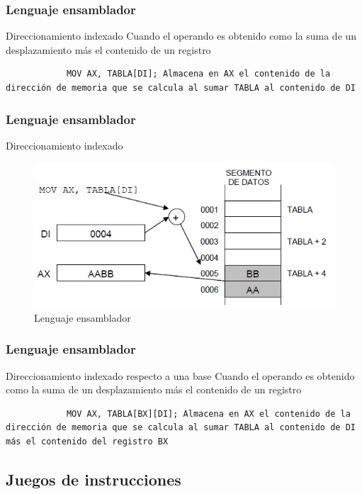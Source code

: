 \documentclass{beamer}
\begin{document}
\begin{frame}[fragile]
	\frametitle{Lenguaje ensamblador}
	\begin{block}{Direccionamiento indexado}
		Cuando el operando es obtenido como la suma de un desplazamiento más el contenido de un registro
		\begin{lstlisting}
			MOV AX, TABLA[DI]; Almacena en AX el contenido de la dirección de memoria que se calcula al sumar TABLA al contenido de DI
		\end{lstlisting}
	\end{block}
\end{frame}

\begin{frame}
	\frametitle{Lenguaje ensamblador}
	\begin{block}{Direccionamiento indexado}
		\begin{figure}[H]
			\centering
			\includegraphics[scale=0.6]{imagenes/ensamabladorindexado.jpg}
			\caption{Lenguaje ensamblador}
		\end{figure}
	\end{block}		 		
\end{frame}

\begin{frame}[fragile]
	\frametitle{Lenguaje ensamblador}
	\begin{block}{Direccionamiento indexado respecto a una base}
		Cuando el operando es obtenido como la suma de un desplazamiento más el contenido de un registro
		\begin{lstlisting}
			MOV AX, TABLA[BX][DI]; Almacena en AX el contenido de la dirección de memoria que se calcula al sumar TABLA al contenido de DI más el contenido del registro BX
		\end{lstlisting}
	\end{block}
\end{frame}

\subsection{Juegos de instrucciones}
\end{document}
